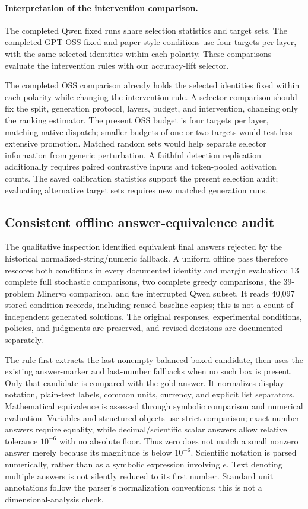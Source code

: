 \documentclass[12pt,a4paper,twoside,openright]{book}
\begin{document}
\paragraph{Interpretation of the intervention comparison.}
The completed Qwen fixed runs share selection statistics and target sets.
The completed GPT-OSS fixed and paper-style conditions use four targets
per layer, with the same selected identities within each polarity.
These comparisons evaluate the intervention rules with our accuracy-lift
selector.

The completed OSS comparison already holds the selected identities fixed
within each polarity while changing the intervention rule. A selector
comparison should fix the split, generation protocol, layers, budget, and
intervention, changing only the ranking estimator. The present OSS budget is
four targets per layer, matching native dispatch; smaller budgets of one or
two targets would test less extensive promotion. Matched random sets would
help separate selector information from generic perturbation. A faithful
detection replication additionally requires paired contrastive inputs and
token-pooled activation counts. The saved calibration statistics support the
present selection audit; evaluating alternative target sets requires new
matched generation runs.

\subsection{Consistent offline answer-equivalence audit}
\label{sec:guiding-rescoring}

The qualitative inspection identified equivalent final answers rejected by
the historical normalized-string/numeric fallback. A uniform offline pass
therefore rescores both conditions in every documented identity and
margin evaluation: 13 complete full stochastic comparisons, two complete
greedy comparisons, the 39-problem Minerva comparison, and the interrupted
Qwen subset. It reads 40,097 stored condition records, including reused
baseline copies; this is not a count of independent generated solutions.
The original responses, experimental conditions, policies, and judgments
are preserved, and revised decisions are documented separately.

The rule first extracts the last nonempty balanced boxed candidate, then
uses the existing answer-marker and last-number fallbacks when no such box
is present. Only that candidate is compared with the gold answer. It
normalizes display notation, plain-text labels, common units, currency,
and explicit list separators. Mathematical equivalence is assessed through
symbolic comparison and numerical evaluation.
Variables and structured objects use strict comparison; exact-number
answers require equality, while decimal/scientific scalar answers allow
relative tolerance $10^{-6}$ with no absolute floor. Thus zero does not
match a small nonzero answer merely because its magnitude is below
$10^{-6}$. Scientific notation is parsed numerically, rather than as a
symbolic expression involving $e$. Text denoting multiple answers is not
silently reduced to its first number. Standard unit annotations follow the
parser's normalization conventions; this is not a dimensional-analysis check.
\end{document}

